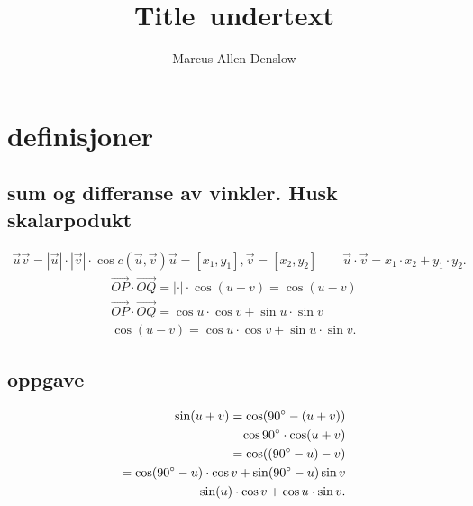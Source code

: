\documentclass{report}
\title{\Huge{Title}\ undertext}
\author{\Huge{Marcus Allen Denslow}}
\date{}
\begin{document}
\maketitle
\newpage%
\tableofcontents
\pagebreak

\chapter{definisjoner}
\section{sum og differanse av vinkler. Husk skalarpodukt}
\begin{align*}
	\vec{u} \vec{v} = |\vec{u}| \cdot |\vec{v}| \cdot \cos c(\vec{u}, \vec{v})
	\vec{u} = [x_1, y_1], \vec{v} = [x_2, y_2] \qquad \vec{u} \cdot \vec{v} = x_1  \cdot x_2 + y_1 \cdot y_2
.\end{align*}
\begin{align*}
    \vec{OP} \cdot \vec{OQ} = |\cdot| \cdot \cos(u-v)=\cos(u-v)\\
	\vec{OP} \cdot \vec{OQ} = \cos u \cdot \cos v + \sin u \cdot \sin v \\
	\cos(u-v) = \cos u \cdot \cos v + \sin u \cdot \sin v
.\end{align*}


\section{oppgave}
\sol
\begin{align*}
\sin(u+v) = \cos(90\degree - (u+v))\\
	\cos 90\degree \cdot \cos (u + v) \\
	= \cos ((90\degree - u)-v)\\
	= \cos(90\degree - u) \cdot \cos v + \sin(90\degree - u) \sin v \\
	\sin(u) \cdot \cos v + \cos u \cdot \sin v
.\end{align*}
\end{document}
